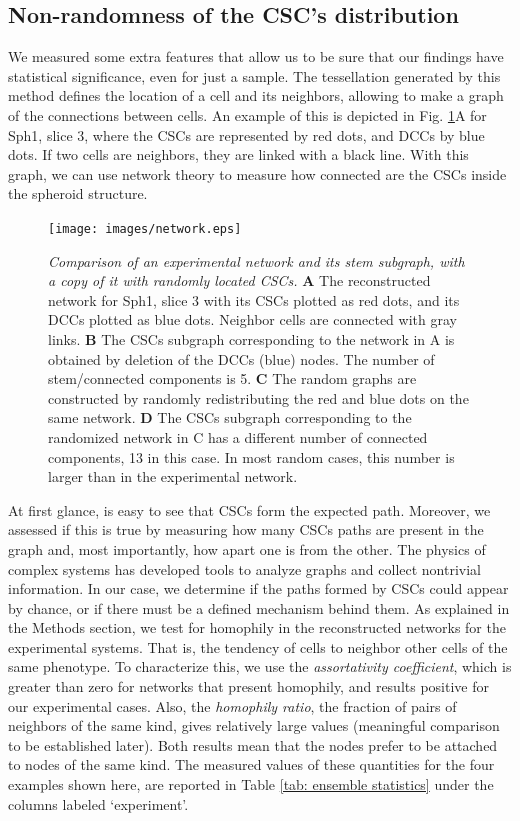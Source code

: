 \documentclass[fleqn,10pt]{wlscirep}
\begin{document}
\subsection*{Non-randomness of the CSC's distribution}

We measured some extra features that allow us to be sure that our findings have statistical significance, even for just a sample. The tessellation generated by this method defines the location of a cell and its neighbors, allowing to make a graph of the connections between cells. An example of this is depicted in Fig. \ref{fig: Delaunay sph1 slice3}A for \textsf{ Sph1, slice 3}, where the CSCs are represented by red dots, and DCCs by blue dots. If two cells are neighbors, they are linked with a black line. With this graph, we can use network theory to measure how connected are the CSCs inside the spheroid structure. 

\begin{figure}[!ht]
        \centering
        \texttt{[image: images/network.eps]}
    \caption{\emph{Comparison of an experimental network and its stem subgraph, with a copy of it with randomly located CSCs.} {\bf A} The reconstructed network for \textsf{ Sph1, slice 3} with its CSCs plotted as red dots, and its DCCs plotted as blue dots. Neighbor cells are connected with gray links. {\bf B} The CSCs subgraph corresponding to the network in A is obtained by deletion of the DCCs (blue) nodes. The number of stem/connected components is 5. {\bf C} The random graphs are constructed by randomly redistributing the red and blue dots on the same network. {\bf D} The  CSCs subgraph corresponding to the randomized network in C has a different number of connected components, 13 in this case. In most random cases, this number is larger than in the experimental network. }
    \label{fig: Delaunay sph1 slice3}
\end{figure}

At first glance, is easy to see that CSCs form the expected path. Moreover, we assessed if this is true by measuring how many CSCs paths are present in the graph and, most importantly, how apart one is from the other. The physics of complex systems has developed tools to analyze graphs and collect nontrivial information. In our case, we determine if the paths formed by CSCs could appear by chance, or if there must be a defined mechanism behind them. As explained in the Methods section, we test for homophily in the reconstructed networks for the experimental systems. That is, the tendency of cells to neighbor other cells of the same phenotype. To characterize this, we use the \emph{assortativity coefficient}, which is greater than zero for networks that present homophily, and results positive for our experimental cases. Also, the \emph{homophily ratio}, the fraction of pairs of neighbors of the same kind, gives relatively large values (meaningful comparison to be established later). Both results mean that the nodes prefer to be attached to nodes of the same kind. The measured values of these quantities for the four examples shown here, are reported in Table \ref{tab: ensemble statistics} under the columns labeled `experiment'.   
\end{document}
